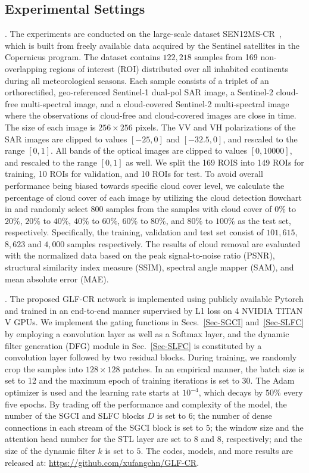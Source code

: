 \documentclass[a4paper,fleqn]{cas-dc}
\begin{document}
\subsection{Experimental Settings}
.
The experiments are conducted on the large-scale dataset SEN12MS-CR~\citep{ebel2020multisensor}, which is built from freely available data acquired by the Sentinel satellites in the Copernicus program. The dataset contains $122,218$ samples from 169 non-overlapping regions of interest (ROI) distributed over all inhabited continents during all meteorological seasons. Each sample consists of a triplet of an orthorectified, geo-referenced Sentinel-1 dual-pol SAR image, a Sentinel-2 cloud-free multi-spectral image, and a cloud-covered Sentinel-2 multi-spectral image where the observations of cloud-free and cloud-covered images are close in time. The size of each image is $256 \times 256$ pixels. 
The VV and VH polarizations of the SAR images are clipped to values $[-25, 0]$ and $[-32.5, 0]$, and rescaled to the range $[0, 1]$. All bands of the optical images are clipped to values $[0, 10000]$, and rescaled to the range $[0, 1]$ as well. 
We split the 169 ROIS into 149 ROIs for training, 10 ROIs for validation, and 10 ROIs for test. To avoid overall performance being biased towards specific cloud cover level, we calculate the percentage of cloud cover of each image by utilizing the cloud detection flowchart in \cite{meraner2020cloud} and randomly select 800 samples from the samples with cloud cover of $0\%$ to $20\%$, $20\%$ to $40\%$, $40\%$ to $60\%$, $60\%$ to $80\%$, and $80\%$ to $100\%$ as the test set, respectively. Specifically, the training, validation and test set consist of $101,615$, $8,623$ and $4,000$ samples respectively. 
The results of cloud removal are evaluated with the normalized data based on the peak signal-to-noise ratio (PSNR), structural similarity index measure (SSIM), spectral angle mapper (SAM), and mean absolute error (MAE).

. 
The proposed GLF-CR network is implemented using publicly available Pytorch and trained in an end-to-end manner supervised by L1 loss on 4 NVIDIA TITAN V GPUs. We implement the gating functions in Secs.~\ref{Sec-SGCI} and~\ref{Sec-SLFC} by employing a convolution layer as well as a Softmax layer, and the dynamic filter generation (DFG) module in Sec.~\ref{Sec-SLFC} is constituted by a convolution layer followed by two residual blocks. 
During training, we randomly crop the samples into $128 \times 128$ patches. In an empirical manner, the batch size is set to 12 and the maximum epoch of training iterations is set to 30. The Adam optimizer is used and the learning rate starts at $10^{-4}$, which decays by $50\%$ every five epochs. By trading off the performance and complexity of the model, the number of the SGCI and SLFC blocks $D$ is set to $6$; the number of dense connections in each stream of the SGCI block is set to $5$; the window size and the attention head number for the STL layer are set to $8$ and $8$, respectively; and the size of the dynamic filter $k$ is set to $5$. The codes, models, and more results are released at: \url{https://github.com/xufangchn/GLF-CR}.
\end{document}
